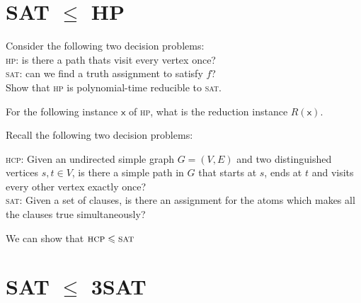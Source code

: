\frmrule




\section{SAT $\leqslant$ HP}



Consider the following two decision problems:\\
\textsc{hp}: is there a path thats visit every vertex once? \\
\textsc{sat}: can we find a truth assignment to satisfy $f$? \\
Show that \textsc{hp} is polynomial-time reducible to \textsc{sat}.



\frmrule


\begin{example}
For the following instance $\textsf{x}$ of \textsc{hp}, what is
the reduction instance $R(\textsf{x})$. 
\end{example}

\frmrule


\begin{example}
Recall the following two decision problems:

\textsc{hcp}: Given an undirected simple graph $G = (V,E)$ 
and two distinguished vertices $s, t \in V$, 
is there a simple path in $G$ that starts at $s$, ends at $t$ 
and visits every other vertex exactly once?\\
\textsc{sat}: Given a set of clauses, is there an 
assignment for the atoms which makes all the clauses true simultaneously?

We can show that $\textsc{hcp} \leqslant \textsc{sat}$
\end{example}




\section{SAT $\leqslant$ 3SAT}


